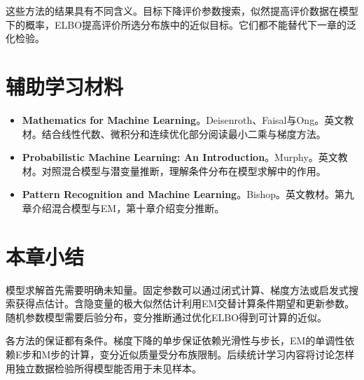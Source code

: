 这些方法的结果具有不同含义。目标下降评价参数搜索，似然提高评价数据在模型下的概率，ELBO提高评价所选分布族中的近似目标。它们都不能替代下一章的泛化检验。

\section*{辅助学习材料}
\begin{itemize}
\item \textbf{Mathematics for Machine Learning}。Deisenroth、Faisal与Ong。英文教材。结合线性代数、微积分和连续优化部分阅读最小二乘与梯度方法。\cite{deisenroth2020mml}
\item \textbf{Probabilistic Machine Learning: An Introduction}。Murphy。英文教材。对照混合模型与潜变量推断，理解条件分布在模型求解中的作用。\cite{murphy2022pml}
\item \textbf{Pattern Recognition and Machine Learning}。Bishop。英文教材。第九章介绍混合模型与EM，第十章介绍变分推断。\cite{bishop2006pattern}
\end{itemize}

\section{本章小结}

模型求解首先需要明确未知量。固定参数可以通过闭式计算、梯度方法或启发式搜索获得点估计。含隐变量的极大似然估计利用EM交替计算条件期望和更新参数。随机参数模型需要后验分布，变分推断通过优化ELBO得到可计算的近似。

各方法的保证都有条件。梯度下降的单步保证依赖光滑性与步长，EM的单调性依赖E步和M步的计算，变分近似质量受分布族限制。后续统计学习内容将讨论怎样用独立数据检验所得模型能否用于未见样本。




